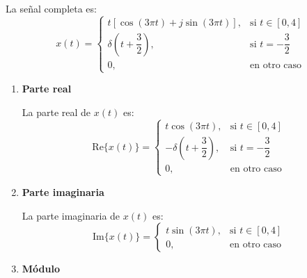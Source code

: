 \begin{enumerate}[label=\color{red}\textbf{\arabic*)}]
\begin{enumerate}[label=Paso \arabic*:]
        La señal completa es:  \[
        x(t)=\begin{cases}
            t[\cos(3\pi t)+j\sin(3\pi t)], & \text{si }t\in [0,4]\\
            \delta\left( t+\dfrac{3}{2} \right) , & \text{si }t=-\dfrac{3}{2}\\
            0, & \text{en otro caso}
        \end{cases}
        \] 
        \begin{enumerate}[label=\textbf{\alph*)}]
            \item \textbf{Parte real} 

                La parte real de $x(t)$ es:  \[
                \mathrm{Re}\{x(t)\} =\begin{cases}
                    t\cos(3\pi t), & \text{si }t\in [0,4]\\
                    -\delta\left( t+\dfrac{3}{2} \right) , & \text{si }t=-\dfrac{3}{2}\\
                    0, & \text{en otro caso}
                \end{cases}
                \] 
            \item \textbf{Parte imaginaria}

                La parte imaginaria de $x(t)$ es:  \[
                \mathrm{Im}\{x(t)\} =\begin{cases}
                    t\sin(3\pi t), & \text{si }t\in [0,4]\\
                    0, & \text{en otro caso}
                \end{cases}
                \] 
            \item \textbf{Módulo}


\end{enumerate}
\end{enumerate}
\end{enumerate}
